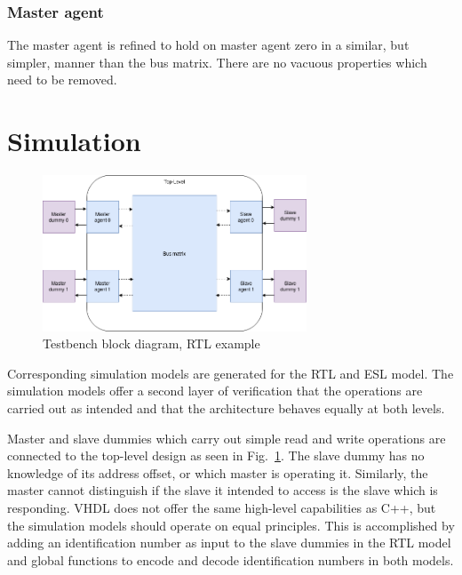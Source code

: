 \subsubsection{Master agent}
The master agent is refined to hold on master agent zero in a similar, but simpler, manner than the bus matrix. There are no vacuous properties which need to be removed. 



\section{Simulation}
\label{sec:sim}
\begin{figure}[hbt]
    \begin{center}
        \includegraphics[width=0.7\textwidth]{figs/testbench.png}
    \end{center}
    \caption{Testbench block diagram, RTL example}
    \label{fig:testbench}
\end{figure}

Corresponding simulation models are generated for the RTL and ESL model. The simulation models offer a second layer of verification that the operations are carried out as intended and that the architecture behaves equally at both levels. \par
Master and slave dummies which carry out simple read and write operations are connected to the top-level design as seen in Fig.~\ref{fig:testbench}. The slave dummy has no knowledge of its address offset, or which master is operating it. Similarly, the master cannot distinguish if the slave it intended to access is the slave which is responding. VHDL does not offer the same high-level capabilities as C++, but the simulation models should operate on equal principles. This is accomplished by adding an identification number as input to the slave dummies in the RTL model and global functions to encode and decode identification numbers in both models. 


